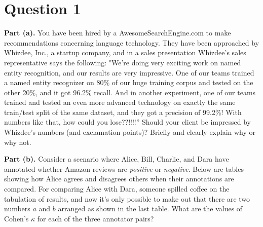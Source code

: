 \documentclass{article}
\newcommand{\solution}[1]{}
\begin{document}
\section*{Question 1}

{\bf Part (a).}
You have been hired by a AwesomeSearchEngine.com to make recommendations concerning language technology.  They have been approached by Whizdee, Inc., a startup company, and in a sales presentation Whizdee's sales representative says the following: "We're doing very exciting work on named entity recognition, and our results are very impressive. One of our teams trained a named entity recognizer on 80\% of our huge training corpus and tested on the other 20\%, and it got 96.2\% recall. And in another experiment, one of our teams trained and tested an even more advanced technology on exactly the same train/test split of the same dataset, and they got a precision of 99.2\%!  With numbers like that, how could you lose??!!!!''  Should your client be impressed by Whizdee's numbers (and exclamation points)?  Briefly and clearly explain why or why not.

\solution{
They did two experiments and both were reported incompletely: the most important thing for the question was to observe that for most tasks, precision and recall, measured independently, can be traded off against each other; so it's very easy to do well on just one or just the other.  Other valid observations include lack of lower/upper bounds for comparison, lack of information on size of the test set, possibility of a ``lucky'' train/test split (which could be addressed by cross-validation), potential importance of extrinsic versus just intrinsic evaluation, and not taking runtime into account.
}

\vspace{0.2in}
{\bf Part (b).}
Consider a scenario where Alice, Bill, Charlie, and Dara have annotated whether Amazon reviews are \emph{positive} or \emph{negative}.  Below are tables showing how Alice agrees and disagrees others when their annotations are compared. For comparing Alice with Dara, someone spilled coffee on the tabulation of results, and now it's only possible to make out that there are two numbers $a$ and $b$ arranged as shown in the last table.  What are the values of Cohen's $\kappa$ for each of the three annotator pairs?  
\end{document}
